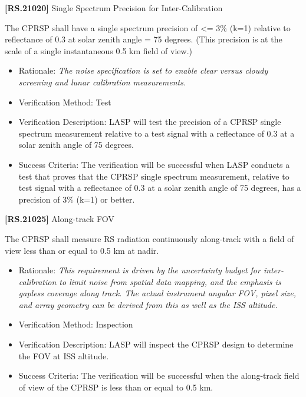 \documentclass[12pt,oneside,oldfontcommands]{memoir}
\begin{document}
\textbf{[RS.21020]} Single Spectrum Precision for Inter-Calibration

The \gls{CPRSP} shall have a single spectrum precision of <= 3\% (k=1) relative to reflectance of 0.3 at solar zenith angle = 75 degrees. (This precision is at the scale of a single instantaneous 0.5 km field of view.)

\begin{itemize}
\item{} Rationale: \emph{The noise specification is set to enable clear versus cloudy screening and lunar calibration measurements.}

\item{} Verification Method: Test

\item{} Verification Description: \gls{LASP} will \gls{test} the precision of a \gls{CPRSP} single spectrum \gls{measure}ment relative to a \gls{test} signal with a reflectance of 0.3 at a solar zenith angle of 75 degrees.

\item{} Success Criteria: The verification will be successful when \gls{LASP} conducts a \gls{test} that proves that the \gls{CPRSP} single spectrum \gls{measure}ment, relative to \gls{test} signal with a reflectance of 0.3 at a solar zenith angle of 75 degrees, has a precision of 3\% (k=1) or better.

\end{itemize}

\textbf{[RS.21025]} Along-track \gls{FOV}

The \gls{CPRSP} shall \gls{measure} \gls{RS} radiation continuously along-track with a field of view less than or equal to 0.5 km at nadir.

\begin{itemize}
\item{} Rationale: \emph{This requirement is driven by the uncertainty budget for inter-calibration to limit noise from spatial data mapping, and the emphasis is gapless coverage along track. The actual instrument angular FOV, pixel size, and array geometry can be derived from this as well as the ISS altitude.}

\item{} Verification Method: Inspection

\item{} Verification Description: \gls{LASP} will inspect the \gls{CPRSP} design to determine the \gls{FOV} at \gls{ISS} altitude.

\item{} Success Criteria: The verification will be successful when the along-track field of view of the \gls{CPRSP} is less than or equal to 0.5 km.

\end{itemize}
\end{document}
